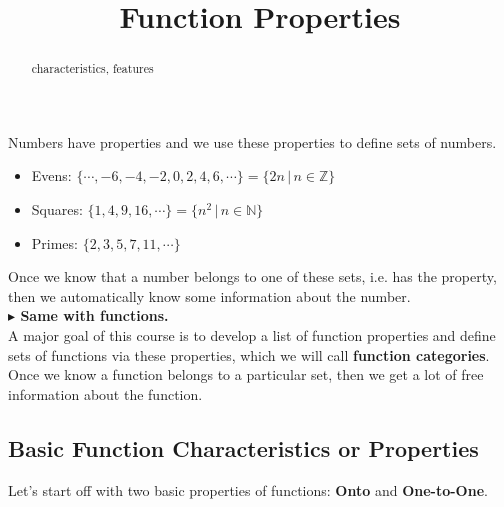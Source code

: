 \documentclass{ximera}
\title{Function Properties}
\begin{document}
\begin{abstract}
characteristics, features
\end{abstract}
\maketitle





Numbers have properties and we use these properties to define sets of numbers. \\



\begin{itemize}
\item Evens:  $\{ \cdots, -6, -4, -2, 0, 2, 4, 6, \cdots \} = \{ 2n   \, | \, n \in \mathbb{Z} \}$
\item Squares:  $\{ 1, 4, 9, 16, \cdots \} = \{ n^2   \, | \, n \in \mathbb{N} \}$
\item Primes:  $\{ 2, 3, 5, 7, 11,  \cdots \}$
\end{itemize}

Once we know that a number belongs to one of these sets, i.e. has the property, then we automatically know some information about the number. \\


\textbf{\textcolor{red!70!black}{$\blacktriangleright$ Same with functions.}}  \\



A major goal of this course is to develop a list of function properties and define sets of functions via these properties, which we will call \textbf{function categories}.  Once we know a function belongs to a particular set, then we get a lot of free information about the function. \\









\subsection*{Basic Function Characteristics or Properties}


Let's start off with two basic properties of functions: \textbf{Onto} and \textbf{One-to-One}.
\end{document}
